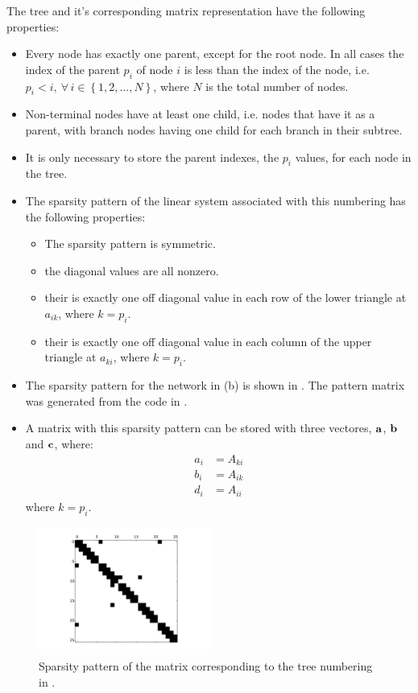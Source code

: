 The tree and it's corresponding matrix representation have the following properties:
\begin{itemize}
\item
    Every node has exactly one parent, except for the root node. In all cases the index of the parent $p_i$ of node $i$ is less than the index of the node, i.e. $p_i<i,~\forall\,i\in\left\{1,2,\dots,N\right\}$, where $N$ is the total number of nodes.
\item
    Non-terminal nodes have at least one child, i.e. nodes that have it as a parent, with branch nodes having one child for each branch in their subtree.
\item
    It is only necessary to store the parent indexes, the $p_i$ values, for each node in the tree.
\item
    The sparsity pattern of the linear system associated with this numbering has the following properties:
    \begin{itemize}
    \item
        The sparsity pattern is symmetric.
    \item
        the diagonal values are all nonzero.
    \item
        their is exactly one off diagonal value in each row of the lower triangle at $a_{ik}$, where $k=p_i$.
    \item
        their is exactly one off diagonal value in each column of the upper triangle at $a_{ki}$, where $k=p_i$.
    \end{itemize}
\item
    The sparsity pattern for the network in (b) is shown in . The pattern matrix was generated from the code in .
\item
    A matrix with this sparsity pattern can be stored with three vectores, $\mathbf{a}$, $\mathbf{b}$ and $\mathbf{c}$, where:
    \begin{align}
        a_i &= A_{ki} \\
        b_i &= A_{ik} \\
        d_i &= A_{ii}
    \end{align}
    where $k=p_i$.
\end{itemize}

\begin{figure}[htp!]
\centering
\includegraphics[width=0.5\textwidth]{./images/sparsity.pdf}
\caption{Sparsity pattern of the matrix corresponding to the tree numbering in .}
\label{fig:sparsity}
\end{figure}


